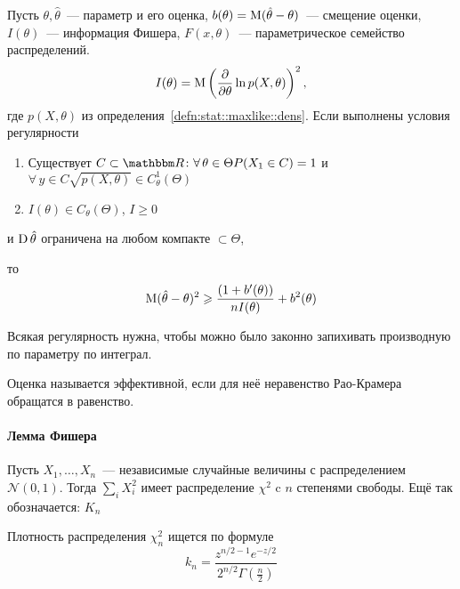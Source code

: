 \documentclass[12pt,ebook]{../../../notes}
\begin{document}
\begin{prop}\label{prop:stat::eff::rao}
  Пусть $\theta, \hat\theta$~--- параметр и его оценка, $b(\theta) = \operatorname{M} (\hat\theta -
  \theta)$~--- смещение оценки, $I(\theta)$~--- информация Фишера, $F(x,\theta)$~---
  параметрическое семейство распределений.
  \[
    I(\theta) = \operatorname{M} \left( \frac{\partial }{\partial \theta} \ln p(X, \theta)\right)^2,
  \]
  где $p(X,\theta)$ из определения~\ref{defn:stat::maxlike::dens}. Если выполнены условия
  регулярности
  \begin{enumerate}
    \item Существует $C\subset\R \colon \forall\, \theta\in \Theta P(X_1 \in C) =1 $ и $\forall\,
      y \in C \sqrt{p(X, \theta)} \in C^1_\theta (\Theta)$
    \item $I(\theta) \in C_\theta(\Theta)$, $I \geqslant 0$
  \end{enumerate}
  и $\operatorname{D} \hat \theta $ ограничена на любом компакте $\subset \Theta$, 
  
  то
  \[
    \operatorname{M} (\hat\theta - \theta)^2 \geqslant \frac{(1+b'(\theta))}{n I(\theta)} + b^2(\theta) 
  \]
\end{prop}
\begin{rem}\label{rem:stat::eff::reg}
  Всякая регулярность нужна, чтобы можно было законно запихивать производную по параметру по
  интеграл. 
\end{rem}

\begin{defn}\label{defn:stat::eff::eff}
  Оценка называется эффективной, если для неё неравенство Рао-Крамера обращатся в равенство.
\end{defn}

\paragraph{Лемма Фишера}
\label{par:stat::fishlem}

\begin{defn}\label{defn:stat::fishlem::chi}
  Пусть $X_1, \dotsc, X_n$~--- независимые случайные величины с распределением $\mathcal N(0,1)$.
  Тогда $\sum_i X_i^2$ имеет распределение $\chi^2$ c $n$ степенями свободы. Ещё так обозначается:
  $K_n$
\end{defn}
\begin{prop}\label{prop:stat::fishlem::chidens}
  Плотность распределения $\chi^2_n$ ищется по формуле \[\displaystyle k_n = \frac{z^{n/2-1}
  e^{-z/2}}{2^{n/2} \Gamma \left(\frac{n}{2} \right)} \]
\end{prop}
\end{document}
